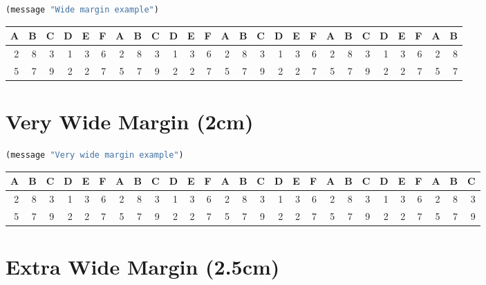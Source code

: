 \documentclass[a4paper,oneside,toc=bibliography,toc=listof]{scrbook}
\newenvironment{widemargin}{
\begin{center}
\begin{adjustwidth}{-1.5cm}{-1.5cm}
}{
\end{adjustwidth}
\end{center}
}
\newenvironment{verywidemargin}{
\begin{center}
\begin{adjustwidth}{-2cm}{-2cm}
}{
\end{adjustwidth}
\end{center}
}
\begin{document}
\begin{widemargin}
\begin{lstlisting}[language=Lisp,numbers=none]
  (message "Wide margin example")
\end{lstlisting}

\begin{center}
\begin{tabular}{rrrrrrrrrrrrrrrrrrrrrrrrrr}
A & B & C & D & E & F & A & B & C & D & E & F & A & B & C & D & E & F & A & B & C & D & E & F & A & B\\
\hline
2 & 8 & 3 & 1 & 3 & 6 & 2 & 8 & 3 & 1 & 3 & 6 & 2 & 8 & 3 & 1 & 3 & 6 & 2 & 8 & 3 & 1 & 3 & 6 & 2 & 8\\
5 & 7 & 9 & 2 & 2 & 7 & 5 & 7 & 9 & 2 & 2 & 7 & 5 & 7 & 9 & 2 & 2 & 7 & 5 & 7 & 9 & 2 & 2 & 7 & 5 & 7\\
\end{tabular}
\end{center}

\end{widemargin}
\section{Very Wide Margin (2cm)}
\label{sec:orgcb15d45}

\begin{verywidemargin}
\begin{lstlisting}[language=Lisp,numbers=none]
  (message "Very wide margin example")
\end{lstlisting}

\begin{center}
\begin{tabular}{rrrrrrrrrrrrrrrrrrrrrrrrrrr}
A & B & C & D & E & F & A & B & C & D & E & F & A & B & C & D & E & F & A & B & C & D & E & F & A & B & C\\
\hline
2 & 8 & 3 & 1 & 3 & 6 & 2 & 8 & 3 & 1 & 3 & 6 & 2 & 8 & 3 & 1 & 3 & 6 & 2 & 8 & 3 & 1 & 3 & 6 & 2 & 8 & 3\\
5 & 7 & 9 & 2 & 2 & 7 & 5 & 7 & 9 & 2 & 2 & 7 & 5 & 7 & 9 & 2 & 2 & 7 & 5 & 7 & 9 & 2 & 2 & 7 & 5 & 7 & 9\\
\end{tabular}
\end{center}
\end{verywidemargin}
\section{Extra Wide Margin (2.5cm)}
\label{sec:org15d4bdf}
\end{document}
